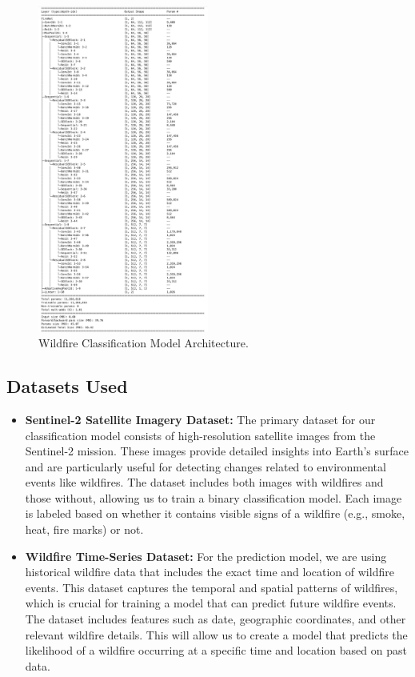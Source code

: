 \documentclass[conference]{IEEEtran}
\begin{document}
\begin{figure}[h!]
    \centering
    \includegraphics[width=0.5\textwidth]{model.jpeg}
    \caption{Wildfire Classification Model Architecture.}
    \label{fig:your_image_label}
\end{figure}

\subsection{Datasets Used}
\begin{itemize}
    \item \textbf{Sentinel-2 Satellite Imagery Dataset:} The primary dataset for our classification model consists of high-resolution satellite images from the Sentinel-2 mission. These images provide detailed insights into Earth's surface and are particularly useful for detecting changes related to environmental events like wildfires. The dataset includes both images with wildfires and those without, allowing us to train a binary classification model. Each image is labeled based on whether it contains visible signs of a wildfire (e.g., smoke, heat, fire marks) or not.\\
    \item \textbf{Wildfire Time-Series Dataset:} For the prediction model, we are using historical wildfire data that includes the exact time and location of wildfire events. This dataset captures the temporal and spatial patterns of wildfires, which is crucial for training a model that can predict future wildfire events. The dataset includes features such as date, geographic coordinates, and other relevant wildfire details. This will allow us to create a model that predicts the likelihood of a wildfire occurring at a specific time and location based on past data.
\end{itemize}
\end{document}
